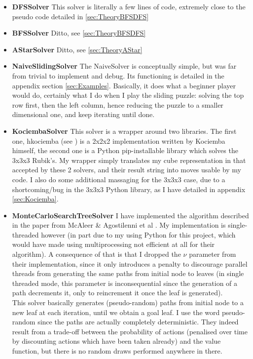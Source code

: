 \begin{itemize}
\item \textbf{DFSSolver} This solver is literally a few lines of code, extremely close to the pseudo code detailed in \ref{sec:TheoryBFSDFS}
\item \textbf{BFSSolver} Ditto, see \ref{sec:TheoryBFSDFS}
\item \textbf{AStarSolver} Ditto, see \ref{sec:TheoryAStar}
\item \textbf{NaiveSlidingSolver} The NaiveSolver is conceptually simple, but was far from trivial to implement and debug. Its functioning is detailed in the appendix section \ref{sec:Examples}. Basically, it does what a beginner player would do, certainly what I do when I play the sliding puzzle: solving the top row first, then the left column, hence reducing the puzzle to a smaller dimensional one, and keep iterating until done.
\item \textbf{KociembaSolver} This solver is a wrapper around two libraries. The first one, hkociemba (see \cite{HKociemba}) is a 2x2x2 implementation written by Kociemba himself, the second one is a Python pip-installable library which solves the 3x3x3 Rubik's. My  wrapper simply translates my cube representation in that accepted by these 2 solvers, and their result string into moves usable by my code. I also do some additional massaging for the 3x3x3 case, due to a shortcoming/bug in the 3x3x3 Python library, as I have detailed in appendix \ref{sec:Kociemba}.
\item \textbf{MonteCarloSearchTreeSolver} I have implemented the algorithm described in the paper from McAleer \& Agostilenni et al \cite{https://doi.org/10.48550/arxiv.1805.07470}. My implementation is single-threaded however (in part due to my using Python for this project, which would have made using multiprocessing not efficient at all for their algorithm). A consequence of that is that I dropped the $\nu$ parameter from their implementation, since it only introduces a penalty to discourage parallel threads from generating the same paths from initial node to leaves (in single threaded mode, this parameter is inconsequential since the generation of a path decrements it, only to reincrement it once the leaf is generated).
\\
This solver basically generates (pseudo-random) paths from initial node to a new leaf at each iteration, until we obtain a goal leaf. I use the word pseudo-random since the paths are actually completely deterministic. They indeed result from a trade-off between the probability of actions (penalised over time by discounting actions which have been taken already) and the value function, but there is no random draws performed anywhere in there.

\end{itemize}
